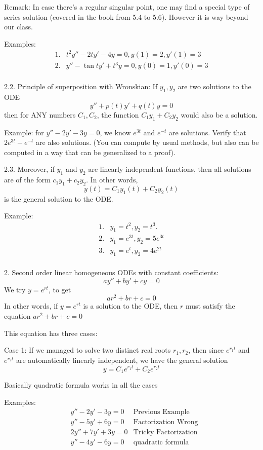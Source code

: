\documentclass[11pt]{article}
\begin{document}
Remark: In case there's a regular singular point, one may find a special type of series solution (covered in the book from 5.4 to 5.6). However it is way beyond our class. 

Examples: $$\begin{aligned}
1. & t^2 y'' - 2t y' - 4y = 0, y(1)=2, y'(1) = 3 \\
2. & y'' - \tan t y' + t^3y = 0, y(0)=1, y'(0)=3 \\
\end{aligned}$$  

2.2. Principle of superposition with Wronskian: If $y_1, y_2$ are two solutions to the ODE 
$$y'' + p(t)y'+ q(t) y = 0$$
then for ANY numbers $C_1, C_2$, the function $C_1y_1 + C_2y_2$ would also be a solution. 

Example: for $y''- 2y' - 3y = 0$, we know $e^{3t}$ and $e^{-t}$ are solutions. Verify that $2e^{3t}- e^{-t}$ are also solutions. (You can compute by usual methods, but also can be computed in a way that can be generalized to a proof). 

2.3. Moreover, if $y_1$ and $y_2$ are linearly independent functions, then all solutions are of the form $c_1y_1 + c_2y_2$. In other words, 
$$y(t)=C_1y_1(t)+C_2y_2(t)$$
is the general solution to the ODE. 

Example:
$$\begin{aligned}
1. & y_1 = t^2, y_2 = t^3.\\
2. & y_1 = e^{3t}, y_2 = 5 e^{3t}\\
3. & y_1 = e^t, y_2 = 4e^{2t}\\
\end{aligned}$$

2. Second order linear homogeneous ODEs with constant coefficients:
$$ay'' + by' + cy = 0$$
We try $y = e^{rt}$, to get 
$$ar^2 + br + c=0$$
In other words, if $y=e^{rt}$ is a solution to the ODE, then $r$ must satisfy the equation $ar^2+br+c=0$

This equation has three cases:

Case 1: If we managed to solve two distinct real roots $r_1, r_2$, then since $e^{r_1t}$ and $e^{r_2t}$ are automatically linearly independent, we have the general solution
$$y=C_1e^{r_1t} + C_2 e^{r_2 t}$$

Basically quadratic formula works in all the cases

Examples:
$$\begin{aligned}
&y'' - 2y' - 3y = 0 & \text{Previous Example}\\
&y'' - 5y' + 6y = 0 & \text{Factorization Wrong}\\
&2y'' + 7y' + 3y = 0 &\text{Tricky Factorization}\\
&y'' - 4y' - 6y = 0 &\text{quadratic formula}
\end{aligned}$$
\end{document}
